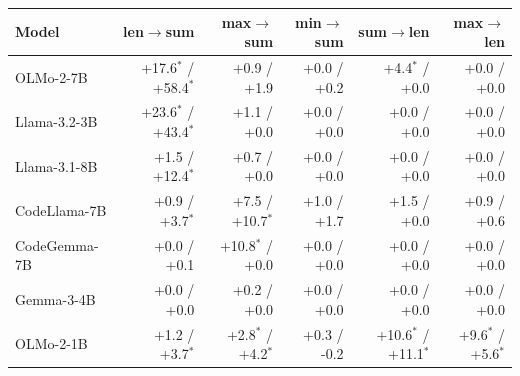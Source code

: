\begin{tabular}{@{}lrrrrr@{}}
\toprule
Model & len$\to$sum & max$\to$sum & min$\to$sum & sum$\to$len & max$\to$len \\
\midrule
OLMo-2-7B & +17.6$^{*}$ / +58.4$^{*}$ & +0.9 / +1.9 & +0.0 / +0.2 & +4.4$^{*}$ / +0.0 & +0.0 / +0.0 \\
Llama-3.2-3B & +23.6$^{*}$ / +43.4$^{*}$ & +1.1 / +0.0 & +0.0 / +0.0 & +0.0 / +0.0 & +0.0 / +0.0 \\
Llama-3.1-8B & +1.5 / +12.4$^{*}$ & +0.7 / +0.0 & +0.0 / +0.0 & +0.0 / +0.0 & +0.0 / +0.0 \\
CodeLlama-7B & +0.9 / +3.7$^{*}$ & +7.5 / +10.7$^{*}$ & +1.0 / +1.7 & +1.5 / +0.0 & +0.9 / +0.6 \\
CodeGemma-7B & +0.0 / +0.1 & +10.8$^{*}$ / +0.0 & +0.0 / +0.0 & +0.0 / +0.0 & +0.0 / +0.0 \\
Gemma-3-4B & +0.0 / +0.0 & +0.2 / +0.0 & +0.0 / +0.0 & +0.0 / +0.0 & +0.0 / +0.0 \\
OLMo-2-1B & +1.2 / +3.7$^{*}$ & +2.8$^{*}$ / +4.2$^{*}$ & +0.3 / -0.2 & +10.6$^{*}$ / +11.1$^{*}$ & +9.6$^{*}$ / +5.6$^{*}$ \\
\bottomrule
\end{tabular}
